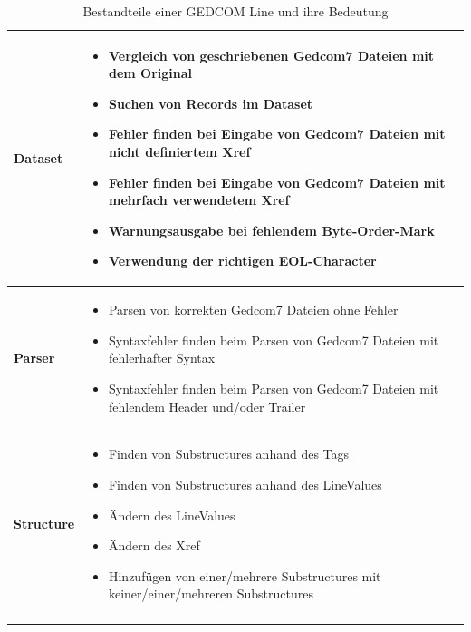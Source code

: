 \bgroup
\def\arraystretch{1.5}%
\setlength{\tabcolsep}{18pt}
\begin{longtable}{|p{2cm}|p{10cm}|}
	\hline
	\textbf{Dataset} & { \vspace{-1.8em}
		\begin{itemize}
			\item Vergleich von geschriebenen Gedcom7 Dateien mit dem Original
			\item Suchen von Records im Dataset
			\item Fehler finden bei Eingabe von Gedcom7 Dateien mit nicht definiertem Xref
			\item Fehler finden bei Eingabe von Gedcom7 Dateien mit mehrfach verwendetem Xref
			\item Warnungsausgabe bei fehlendem Byte-Order-Mark
			\item Verwendung der richtigen EOL-Character
	\end{itemize}\vspace{-1.6em}}\\
	\hline
	\textbf{Parser} & { \vspace{-1.8em}
		\begin{itemize}
			\item Parsen von korrekten Gedcom7 Dateien ohne Fehler
			\item Syntaxfehler finden beim Parsen von Gedcom7 Dateien mit fehlerhafter Syntax
			\item Syntaxfehler finden beim Parsen von Gedcom7 Dateien mit fehlendem Header und/oder Trailer
		\end{itemize}\vspace{-1.6em}}\\
	\hline
	\textbf{Structure} & { \vspace{-1.8em}
		\begin{itemize}
			\item Finden von Substructures anhand des Tags
			\item Finden von Substructures anhand des LineValues
			\item Ändern des LineValues
			\item Ändern des Xref
			\item Hinzufügen von einer/mehrere Substructures mit keiner/einer/mehreren Substructures
		\end{itemize}\vspace{-1.6em}}\\
	\hline
	\caption{Bestandteile einer GEDCOM Line und ihre Bedeutung} %
	\label{tab: gedcom line}
\end{longtable}
\egroup
\vspace{1em}